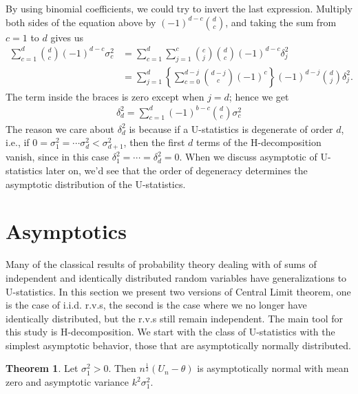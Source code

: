 \documentclass{article}
\theoremstyle{definition}
\newtheorem{theorem}{Theorem}
\numberwithin{Def}{section}
\begin{document}
    By using binomial coefficients, we could try to invert the last expression. Multiply both sides of the equation above by  $(-1)^{d-c} {d \choose c}$, and taking the sum from $c = 1$ to $d$ gives us
    \begin{align*}
        \sum_{c=1}^d {d \choose c} (-1)^{d-c} \sigma_{c}^2 &= \sum_{c=1}^d  
       \sum_{j = 1}^c {c \choose j}  {d \choose c} (-1)^{d-c} \delta_j^2 \\
       &= \sum_{j=1}^d \left\{ \sum_{c = 0}^{d - j} {d - j \choose c} (-1)^c \right\} (-1)^{d -j} {d \choose j} \delta_j^2.
    \end{align*}
    The term inside the braces is zero except when $j = d$; hence we get 
    \begin{align*}
        \delta_d^2 = \sum_{c = 1}^d (-1)^{b-c} {d \choose c} \sigma_{c}^2
    \end{align*}
    The reason we care about $\delta_d^2$ is because if a U-statistics is degenerate of order $d$, i.e., if $0 = \sigma_1^2 = \cdots \sigma_d^2 < \sigma_{d+1}^2$, then the first $d$ terms of the H-decomposition vanish, since in this case $\delta_1^2 = \cdots = \delta_d^2 = 0.$ When we discuss asymptotic of U-statistics later on, we'd see that the order of degeneracy determines the asymptotic distribution of the U-statistics.  
    
    
    
    \section{Asymptotics} 
    Many of the classical results of probability theory dealing with of sums of independent and identically distributed random variables have generalizations to U-statistics. In this section we present two versions of Central Limit theorem, one is the case of i.i.d. r.v.s, the second is the case where we no longer have identically distributed, but the r.v.s still remain independent. 
    The main tool for this study is H-decomposition. We start with the class of U-statistics with the simplest asymptotic behavior, those that are asymptotically normally distributed. 
    
    \begin{theorem}
    Let $\sigma_1^{2} > 0$. Then $n^{\frac{1}{2}}(U_n - \theta)$ is asymptotically normal with mean zero and asymptotic variance $k^2 \sigma_1^2$.
    \end{theorem}
    
\end{document}
